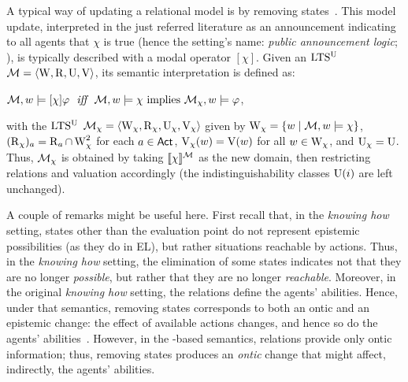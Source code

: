 

A typical way of updating a relational model is by removing states~\cite{Plaza89:lopc,DELbook}. This model update, interpreted in the just referred literature as an announcement indicating to all agents that $\chi$ is true (hence the setting's name: \emph{public announcement logic}; \PAL), is typically described with a modal operator $[\chi]$. Given an $\textup{LTS$^\text{\textup{U}}$}$ $\mathcal{M}=\langle \operatorname{W},\operatorname{R},\operatorname{U},\operatorname{V} \rangle$, its semantic interpretation is defined as:
\begin{spcenter}
  $\modults,w\models[\chi]\varphi \ \ \iff \ \  \modults,w\models\chi \mbox{ implies } \modults_{\chi},w\models\varphi$,
\end{spcenter}
with the $\textup{LTS$^\text{\textup{U}}$}$ $\mathcal{M}_\chi=\langle \operatorname{W}_\chi,\operatorname{R}_\chi,\operatorname{U}_\chi,\operatorname{V}_\chi \rangle$ given by $\operatorname{W}_\chi = \{ w \mid \mathcal{M},w\models\chi \}$, $(\operatorname{R}_\chi)_a = \operatorname{R}_a \cap \operatorname{W}_\chi^2$ for each $a\in{\rm \sf Act}$, $\operatorname{V}_\chi(w) = \operatorname{V}(w)$ for all $w\in\operatorname{W}_\chi$, and $\operatorname{U}_\chi = {\operatorname{U}}$.
Thus, $\mathcal{M}_\chi$ is obtained by taking $\llbracket \chi \rrbracket^{\mathcal{M}}$ as the new domain, then restricting relations and valuation accordingly (the indistinguishability classes $\operatorname{U}(i)$ are left unchanged). 

A couple of remarks might be useful here. First recall that, in the \emph{knowing how} setting, states other than the evaluation point do not represent epistemic possibilities (as they do in EL), but rather situations reachable by actions. Thus, in the \emph{knowing how} setting, the elimination of some states indicates not that they are no longer \emph{possible}, but rather that they are no longer \emph{reachable}. Moreover, in the original \emph{knowing how} setting, the relations define the agents' abilities. Hence, under that semantics, removing states corresponds to both an ontic and an epistemic change: the effect of available actions changes, and hence so do the agents' abilities~\cite{Wang2016}. However, in the \ults-based semantics, relations provide only ontic information; thus, removing states produces an \emph{ontic} change that might affect, indirectly, the agents' abilities.

